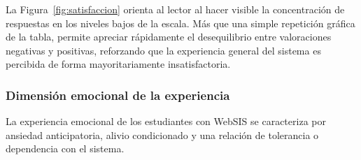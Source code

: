 La Figura~\ref{fig:satisfaccion} orienta al lector al hacer visible la concentración de respuestas en los niveles bajos de la escala. Más que una simple repetición gráfica de la tabla, permite apreciar rápidamente el desequilibrio entre valoraciones negativas y positivas, reforzando que la experiencia general del sistema es percibida de forma mayoritariamente insatisfactoria.
 
\subsubsection{Dimensión emocional de la experiencia}
 
La experiencia emocional de los estudiantes con WebSIS se caracteriza por ansiedad anticipatoria, alivio condicionado y una relación de tolerancia o dependencia con el sistema.
 
